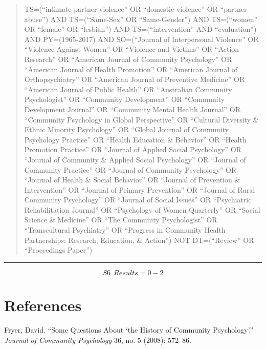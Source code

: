 \documentclass[]{tufte-handout}
\begin{document}
\begin{quote}
TS=(``intimate partner violence'' OR ``domestic violence'' OR ``partner
abuse'') AND TS=(``Same-Sex'' OR ``Same-Gender'') AND TS=(``women'' OR
``female'' OR ``lesbian'') AND TS=(``intervention'' AND ``evaluation'')
AND PY=(1965-2017) AND SO=(``Journal of Interpersonal Violence'' OR
``Violence Against Women'' OR ``Violence and Victims'' OR ``Action
Research'' OR ``American Journal of Community Psychology'' OR ``American
Journal of Health Promotion'' OR ``American Journal of Orthopsychiatry''
OR ``American Journal of Preventive Medicine'' OR ``American Journal of
Public Health'' OR ``Australian Community Psychologist'' OR ``Community
Development'' OR ``Community Development Journal'' OR ``Community Mental
Health Journal'' OR ``Community Psychology in Global Perspective'' OR
``Cultural Diversity \& Ethnic Minority Psychology'' OR ``Global Journal
of Community Psychology Practice'' OR ``Health Education \& Behavior''
OR ``Health Promotion Practice'' OR ``Journal of Applied Social
Psychology'' OR ``Journal of Community \& Applied Social Psychology'' OR
``Journal of Community Practice'' OR ``Journal of Community Psychology''
OR ``Journal of Health \& Social Behavior'' OR ``Journal of Prevention
\& Intervention'' OR ``Journal of Primary Prevention'' OR ``Journal of
Rural Community Psychology'' OR ``Journal of Social Issues'' OR
``Psychiatric Rehabilitation Journal'' OR ``Psychology of Women
Quarterly'' OR ``Social Science \& Medicine'' OR ``The Community
Psychologist'' OR ``Transcultural Psychiatry'' OR ``Progress in
Community Health Partnerships: Research, Education, \& Action'') NOT
DT=(``Review'' OR ``Proceedings Paper'')
\end{quote}

\begin{center}\rule{0.5\linewidth}{\linethickness}\end{center}

\[ S6~~Results = 0-2 \]

\newpage

\section*{References}\label{references}

\hypertarget{refs}{}
\hypertarget{ref-fryer2008some}{}
Fryer, David. ``Some Questions About `the History of Community
Psychology'.'' \emph{Journal of Community Psychology} 36, no. 5 (2008):
572--86.
\end{document}
